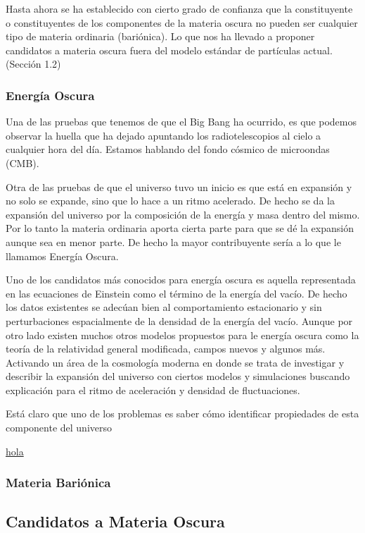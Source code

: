 \documentclass[12pt]{article}
\begin{document}
Hasta ahora se ha establecido con cierto grado de confianza que la constituyente o constituyentes de los componentes de la materia oscura no pueden ser cualquier tipo de materia ordinaria (bariónica). Lo que nos ha llevado a proponer candidatos a materia oscura fuera del modelo estándar de partículas actual. (Sección 1.2)

\subsubsection{Energía Oscura}
\noindent Una de las pruebas que tenemos de que el Big Bang ha ocurrido, es que podemos observar la huella que ha dejado apuntando los radiotelescopios al cielo a cualquier hora del día. Estamos hablando del fondo cósmico de microondas (CMB).

Otra de las pruebas de que el universo tuvo un inicio es que está en expansión y no solo se expande, sino que lo hace a un ritmo acelerado. De hecho se da la expansión del universo por la composición de la energía y masa dentro del mismo. Por lo tanto la materia ordinaria aporta cierta parte para que se dé la expansión aunque sea en menor parte. De hecho la mayor contribuyente sería a lo que le llamamos Energía Oscura.

Uno de los candidatos más conocidos para energía oscura es aquella representada en las ecuaciones de Einstein como el término de la energía del vacío. De hecho los datos existentes se adecúan bien al comportamiento estacionario y sin perturbaciones espacialmente de la densidad de la energía del vacío. Aunque por otro lado existen muchos otros modelos propuestos para le energía oscura como la teoría de la relatividad general modificada, campos nuevos y algunos más. Activando un área de la cosmología moderna en donde se trata de investigar y describir la expansión del universo con ciertos modelos y simulaciones buscando explicación para el ritmo de aceleración y densidad de fluctuaciones.

Está claro que uno de los problemas es saber cómo identificar propiedades de esta componente del universo

\href{Sahni_2004}{hola}

\subsubsection{Materia Bariónica}

\subsection{Candidatos a Materia Oscura}
\end{document}
